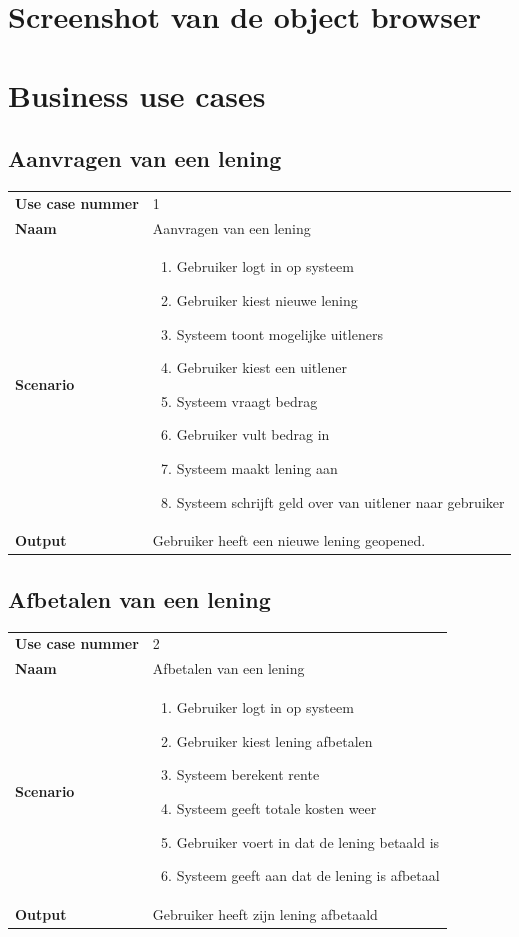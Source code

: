 \documentclass[11pt,english]{article}
\begin{document}
	\newpage
	\section{Screenshot van de object browser}

	\newpage
	\section{Business use cases}
	\subsection{Aanvragen van een lening}
	\begin{tabularx}{\textwidth}{ l | X }
		\textbf{Use case nummer} & 1 \\
		\textbf{Naam} & Aanvragen van een lening \\
		\textbf{Scenario} &
		\begin{enumerate}
			\item Gebruiker logt in op systeem
			\item Gebruiker kiest nieuwe lening
			\item Systeem toont mogelijke uitleners
			\item Gebruiker kiest een uitlener
			\item Systeem vraagt bedrag
			\item Gebruiker vult bedrag in
			\item Systeem maakt lening aan
			\item Systeem schrijft geld over van uitlener naar gebruiker
		\end{enumerate} \\
		\textbf{Output} & Gebruiker heeft een nieuwe lening geopened.
	\end{tabularx}

	\newpage
	\subsection{Afbetalen van een lening}
	\begin{tabularx}{\textwidth}{ l | X }
		\textbf{Use case nummer} & 2 \\
		\textbf{Naam} & Afbetalen van een lening \\
		\textbf{Scenario} &
		\begin{enumerate}
			\item Gebruiker logt in op systeem
			\item Gebruiker kiest lening afbetalen
			\item Systeem berekent rente
			\item Systeem geeft totale kosten weer
			\item Gebruiker voert in dat de lening betaald is
			\item Systeem geeft aan dat de lening is afbetaal
		\end{enumerate} \\
		\textbf{Output} & Gebruiker heeft zijn lening afbetaald
	\end{tabularx}
\end{document}
